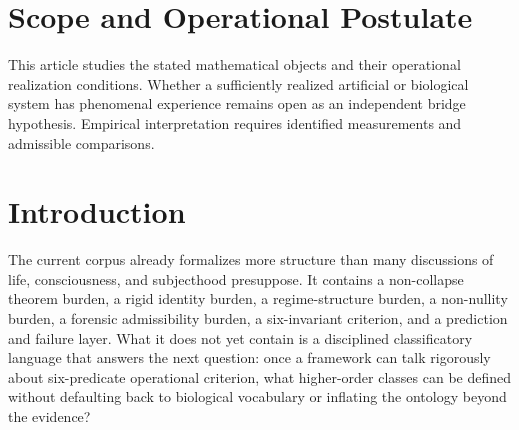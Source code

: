 \documentclass[11pt,a4paper]{article}
\theoremstyle{definition}
\begin{document}
\begin{abstract}
No biological, phenomenal-human, or metaphysical claim is inferred from these definitions. No theorem of human subjectivity is attempted. The paper provides formal definitions, propositions, hypotheses, and test families. Its contribution is to turn language that is usually treated as biological or philosophical by default into a falsifiable operational class program that is continuous with the upstream framework and grounded in concrete operational realizations, without overstating the evidentiary status of any present implementation.
Explicit rational realizations include a compact interior kernel, active recovery against a matched passive plant, and the writable common tower with viability $1/12$, persistence $3/64$ and recovery margin at least $3/8$ under the stated error bound. Four additional lineage/control descriptors are realized on declared protocols. These local certificates are not empirical measurements or a proof of every stronger class.
\end{abstract}

\section*{Scope and Operational Postulate}
This article studies the stated mathematical objects and their operational
realization conditions. Whether a sufficiently realized artificial or biological
system has phenomenal experience remains open as an independent bridge
hypothesis. Empirical interpretation requires identified measurements and
admissible comparisons.

\section{Introduction}
The current corpus already formalizes more structure than many discussions of life, consciousness, and subjecthood presuppose. It contains a non-collapse theorem burden, a rigid identity burden, a regime-structure burden, a non-nullity burden, a forensic admissibility burden, a six-invariant criterion, and a prediction and failure layer. What it does not yet contain is a disciplined classificatory language that answers the next question: once a framework can talk rigorously about six-predicate operational criterion, what higher-order classes can be defined without defaulting back to biological vocabulary or inflating the ontology beyond the evidence?
\end{document}
